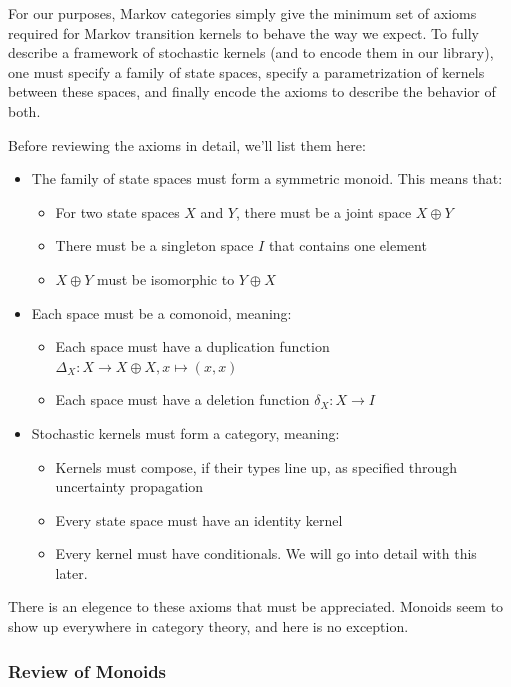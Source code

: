 \documentclass[letterpaper, 10 pt, conference]{ieeeconf}  %
\begin{document}
For our purposes, Markov categories simply give the minimum set of axioms required for Markov transition kernels to behave the way we expect.
To fully describe a framework of stochastic kernels (and to encode them in our library), one must specify a family of state spaces, specify a parametrization of kernels between these spaces, and finally encode the axioms to describe the behavior of both.

Before reviewing the axioms in detail, we'll list them here:

\begin{itemize}
\item  The family of state spaces must form a symmetric monoid. This means that:
\begin{itemize}
  \item  For two state spaces $X$ and $Y$, there must be a joint space $X\oplus Y$
  \item  There must be a singleton space $I$ that contains one element
  \item  $X\oplus Y$ must be isomorphic to $Y\oplus X$
\end{itemize}
\item  Each space must be a comonoid, meaning:
\begin{itemize}
  \item  Each space must have a duplication function $\Delta_X: X\rightarrow X\oplus X, x\mapsto (x,x)$
  \item  Each space must have a deletion function $\delta_X: X\rightarrow I$
\end{itemize}
\item  Stochastic kernels must form a category, meaning:
\begin{itemize}
  \item  Kernels must compose, if their types line up, as specified through uncertainty propagation
  \item  Every state space must have an identity kernel
  \item  Every kernel must have conditionals. We will go into detail with this later.
\end{itemize}
\end{itemize}

There is an elegence to these axioms that must be appreciated.
Monoids seem to show up everywhere in category theory, and here is no exception.

\subsubsection{Review of Monoids}
\end{document}

